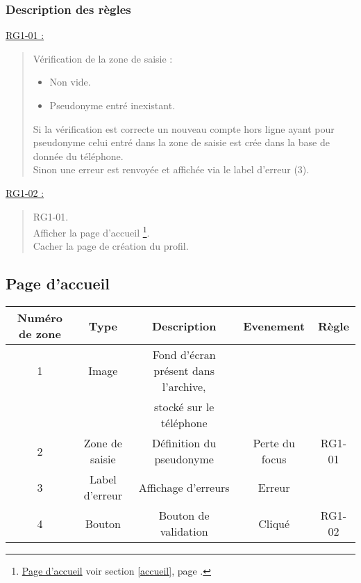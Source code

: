\documentclass{report}
\begin{document}
		\subsubsection{Description des règles}
		
		\underline{RG1-01 :}
			\begin{quote}
				Vérification de la zone de saisie :
				\begin{itemize}
				  \item Non vide.
				  \item Pseudonyme entré inexistant.
				\end{itemize}
				Si la vérification est correcte un nouveau compte hors ligne ayant pour
				pseudonyme celui entré dans la zone de saisie est crée dans la base de donnée
				du téléphone.\\
				Sinon une erreur est renvoyée et affichée via le label d'erreur (3).
			\end{quote}

		\underline{RG1-02 :}
			\begin{quote}
				RG1-01.\\
				Afficher la page d'accueil%
					\footnote[1]{
						\hyperlink{Page d'accueil}{Page d'accueil}
						\og voir section \ref{accueil}, page \pageref{accueil}.\fg
					}.\\
				Cacher la page de création du profil.
			\end{quote}
	
\newpage

	\subsection{Page d'accueil}
		\hypertarget{Page d'accueil}{}
		\label{accueil}
	
		
		
		\begin{tabular}{|c|c|c|c|c|} \hline
			Numéro de zone & Type  & Description & Evenement &	Règle \\\hline 
			1 & Image & Fond d'écran présent dans l'archive, &  &\\\ 
			  &       & stocké sur le téléphone              &	&\\\hline
			2 & Zone de saisie & Définition du pseudonyme & Perte du focus & RG1-01 \\\hline
			3 & Label d'erreur & Affichage d'erreurs      & Erreur         &  \\\hline
			4 & Bouton         & Bouton de validation     & Cliqué & RG1-02 \\\hline
		\end{tabular}
		
\end{document}
